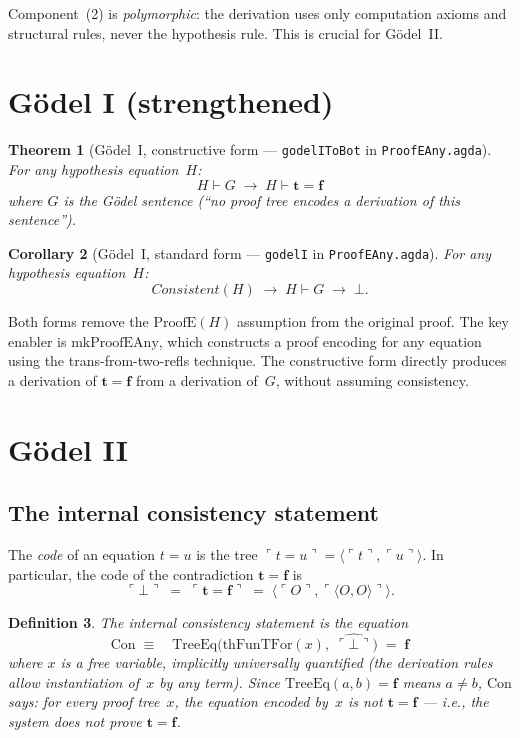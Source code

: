 \documentclass[11pt]{article}
\newtheorem{theorem}{Theorem}
\newtheorem{definition}[theorem]{Definition}
\newtheorem{corollary}[theorem]{Corollary}
\newcommand{\pair}[2]{\langle #1, #2 \rangle}
\newcommand{\trueT}{\mathbf{t}}
\newcommand{\falseT}{\mathbf{f}}
\newcommand{\code}[1]{\ulcorner #1 \urcorner}
\newcommand{\reify}[1]{\widehat{#1}}
\newcommand{\thFunTFor}{\mathrm{thFunTFor}}
\newcommand{\TreeEq}{\mathrm{TreeEq}}
\begin{document}
Component~(2) is \emph{polymorphic}: the derivation uses only
computation axioms and structural rules, never the hypothesis
rule.  This is crucial for G\"odel~II.

\section{G\"odel I (strengthened)}

\begin{theorem}[G\"odel~I, constructive form --- \texttt{godelIToBot} in \texttt{ProofEAny.agda}]
\label{thm:godel1c}
For any hypothesis equation~$H$:
\[
  H \vdash G \;\to\; H \vdash \trueT = \falseT
\]
where $G$ is the G\"odel sentence (``no proof tree encodes
a derivation of this sentence'').
\end{theorem}

\begin{corollary}[G\"odel~I, standard form --- \texttt{godelI} in \texttt{ProofEAny.agda}]
\label{thm:godel1}
For any hypothesis equation~$H$:
\[
  \mathit{Consistent}(H) \;\to\; H \vdash G \;\to\; \bot.
\]
\end{corollary}

\noindent
Both forms remove the $\mathrm{ProofE}(H)$ assumption
from the original proof.  The key enabler is
$\mathrm{mkProofEAny}$, which constructs a proof encoding
for any equation using the trans-from-two-refls technique.
The constructive form directly produces a derivation of
$\trueT = \falseT$ from a derivation of~$G$, without
assuming consistency.

\section{G\"odel II}

\subsection*{The internal consistency statement}

The \emph{code} of an equation $t = u$ is the tree
$\code{t = u} = \pair{\code{t}}{\code{u}}$.  In particular,
the code of the contradiction $\trueT = \falseT$ is
\[
  \code{\bot} \;=\; \code{\trueT = \falseT}
  \;=\; \pair{\code{O}}{\code{\pair{O}{O}}}.
\]

\begin{definition}
The \emph{internal consistency statement} is the equation
\[
  \mathrm{Con} \;\equiv\quad
  \TreeEq\bigl(\thFunTFor(x),\;\reify{\code{\bot}}\bigr) \;=\; \falseT
\]
where $x$ is a free variable, implicitly universally quantified
(the derivation rules allow instantiation of~$x$ by any term).
Since $\TreeEq(a, b) = \falseT$ means $a \neq b$,
$\mathrm{Con}$ says:
\emph{for every proof tree~$x$, the equation encoded by~$x$
is not $\trueT = \falseT$} --- i.e., the system does not
prove $\trueT = \falseT$.
\end{definition}
\end{document}
